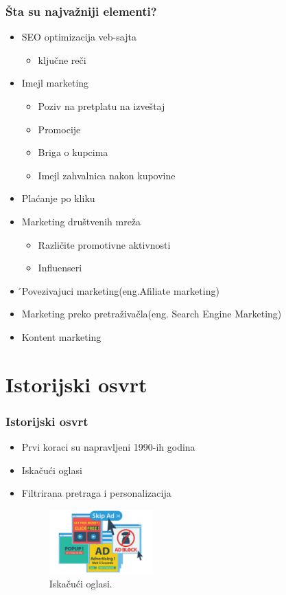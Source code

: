 \documentclass{beamer}
\begin{document}
\begin{frame}[fragile]\frametitle{ Šta su najvažniji elementi?}
	\begin{itemize}	
		\item SEO optimizacija veb-sajta 
		\begin{itemize}
		    \item \large  ključne reči
		\end{itemize}
			\item Imejl marketing
			\begin{itemize}
			    \item Poziv na pretplatu na izveštaj
			    \item Promocije
			    \item Briga o kupcima
			    \item Imejl zahvalnica nakon kupovine
			\end{itemize}
			\item Plaćanje po kliku
			\item Marketing društvenih mreža
			\begin{itemize}
			    \item Različite promotivne aktivnosti
			    \item Influenseri
			\end{itemize}
			\item  ́Povezivajuci marketing(eng.Afiliate marketing)
			\item Marketing preko pretraživačla(eng. Search Engine Marketing)
        		\item Kontent marketing
	\end{itemize}
\end{frame}
\section{Istorijski osvrt}
\begin{frame}[fragile]\frametitle{Istorijski osvrt}
	\begin{itemize}
		\item Prvi koraci su napravljeni 1990-ih godina \\
		\item Iskačući oglasi
        \item Filtrirana pretraga i personalizacija
        \medskip
\begin{figure}[h!]
\begin{center}
\includegraphics[width=4cm]{iskacuci.oglasi.jpg}
\end{center}
\caption{Iskačući oglasi.}
\label{fig:oglasi}
\end{figure}
\end{itemize}
\end{frame}
\end{document}
